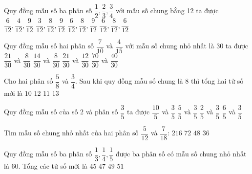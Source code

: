 \begin{ex} %
Quy đồng mẫu số ba phân số $\dfrac{1}{2}, \dfrac{2}{3}, \dfrac{3}{4}$ với mẫu số chung bằng 12 ta được
\choice
{$\dfrac{6}{12}, \dfrac{4}{12}, \dfrac{9}{12}$}
{$\dfrac{3}{12}, \dfrac{8}{12}, \dfrac{9}{12}$}
{\True $\dfrac{6}{12}, \dfrac{8}{12}, \dfrac{9}{12}$}
{$\dfrac{6}{12}, \dfrac{8}{12}, \dfrac{6}{12}$}
\end{ex}

\begin{ex} %
Quy đồng mẫu số hai phân số $\dfrac{7}{10}$ và $\dfrac{4}{15}$ với mẫu số chung nhỏ nhất là 30 ta được
\choice
{\True $\dfrac{21}{30}$ và $\dfrac{8}{30}$}
{$\dfrac{14}{30}$ và $\dfrac{8}{30}$}
{$\dfrac{21}{30}$ và $\dfrac{12}{30}$}
{$\dfrac{70}{30}$ và $\dfrac{40}{30}$}
\end{ex}

\begin{ex} %
Cho hai phân số $\dfrac{5}{8}$ và $\dfrac{3}{4}$. Sau khi quy đồng mẫu số chung là 8 thì tổng hai tử số mới là
\choice
{$10$}
{$12$}
{\True $11$}
{$13$}
\end{ex}

\begin{ex} %
Quy đồng mẫu số của số 2 và phân số $\dfrac{3}{5}$ ta được
\choice
{\True $\dfrac{10}{5}$ và $\dfrac{3}{5}$}
{$\dfrac{5}{5}$ và $\dfrac{3}{5}$}
{$\dfrac{2}{5}$ và $\dfrac{3}{5}$}
{$\dfrac{6}{5}$ và $\dfrac{3}{5}$}
\end{ex}

\begin{ex} %
Tìm mẫu số chung nhỏ nhất của hai phân số $\dfrac{5}{12}$ và $\dfrac{7}{18}$:
\choice
{$216$}
{$72$}
{$48$}
{\True $36$}
\end{ex}

\begin{ex} %
Quy đồng mẫu số ba phân số $\dfrac{1}{3}, \dfrac{1}{4}, \dfrac{1}{5}$ được ba phân số có mẫu số chung nhỏ nhất là 60. Tổng các tử số mới là
\choice
{$45$}
{\True $47$}
{$49$}
{$51$}
\end{ex}

